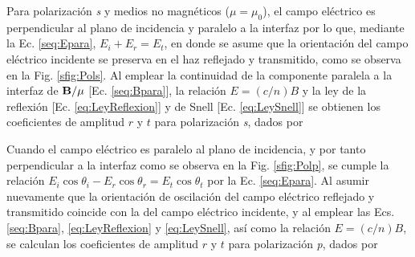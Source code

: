 Para polarización \emph{s} y medios no magnéticos ($\mu=\mu_0$),  el campo eléctrico es perpendicular al plano de incidencia y paralelo a la interfaz por lo que, mediante la Ec. \eqref{seq:Epara}, $E_i + E_r = E_t$, en donde se asume que la orientación del campo eléctrico incidente se preserva en el haz reflejado y transmitido, como se observa en la Fig. \ref{sfig:Pols}. Al emplear la continuidad de la componente paralela a la interfaz de $\vb{B}/\mu$ [Ec. \eqref{seq:Bpara}], la relación $E = (c/n) B$ y la ley de la reflexión [Ec. \ref{eq:LeyReflexion}] y de Snell [Ec. \eqref{eq:LeySnell}] se obtienen los coeficientes de amplitud $r$ y $t$ para  polarización \emph{s}, dados por \vspace*{-.5em}
	\begin{tcolorbox}[title = Coeficientes de amplitud para polarización \emph{s} ]
	\vspace*{-1em}	
	\end{tcolorbox}	 \vspace*{-.5em}\noindent
Cuando el campo eléctrico es paralelo al plano de incidencia, y por tanto perpendicular a la interfaz como se observa en la Fig. \ref{sfig:Polp}, se cumple la relación $E_i\cos\theta_i-E_r\cos\theta_r = E_t \cos\theta_t$ por la Ec. \eqref{seq:Epara}. Al asumir nuevamente que la orientación de oscilación del campo eléctrico reflejado y transmitido coincide con la del campo eléctrico incidente, y al emplear las Ecs. \eqref{seq:Bpara},  \eqref{eq:LeyReflexion} y  \eqref{eq:LeySnell}, así como la relación $E = (c/n) B$, se calculan los  coeficientes de amplitud $r$ y $t$ para  polarización \emph{p}, dados por \vspace*{-.5em}
	\begin{tcolorbox}[title = Coeficientes de amplitud para polarización \emph{p} ]
	\vspace*{-1em}
	\end{tcolorbox}	

